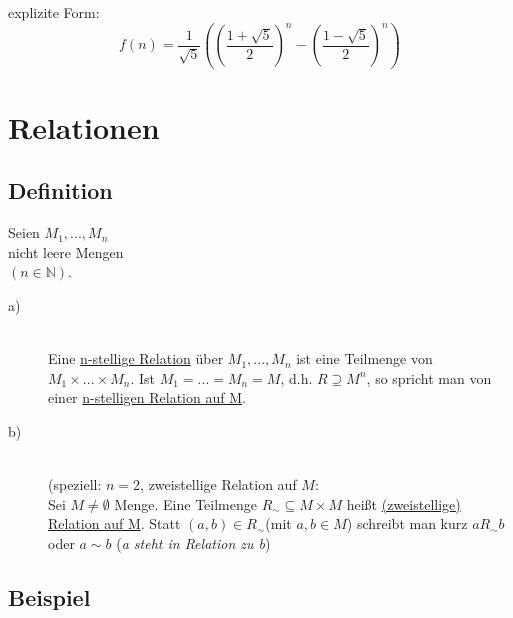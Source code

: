 \documentclass[a4paper, 12pt, twoside] {article}
\begin{document}
explizite Form:
$$f(n) = \frac{1}{\sqrt{5}} (( \frac{1 + \sqrt{5}}{2})^n - (\frac{1- \sqrt{5}}{2})^n)$$

\section{Relationen} %

\subsection{Definition} %
Seien $M_1, ..., M_n$ \\
nicht leere Mengen \\
$(n \in \mathbb{N})$.

\begin{description}

\item[a)] \hfill \\
Eine \underline{n-stellige Relation} über $M_1, ..., M_n$ ist eine Teilmenge von $M_1 \times ... \times M_n$.
Ist $M_1 = ... = M_n = M$, d.h. $R \supseteq M^n$,
so spricht man von einer \underline{n-stelligen Relation auf M}.

\item[b)]  \hfill \\
(speziell: $n = 2$, zweistellige Relation auf $M$: \\
Sei $M \neq \emptyset$ Menge. Eine Teilmenge $R_{\sim} \subseteq M \times M$ heißt \underline{(zweistellige) Relation auf M}. Statt $(a, b) \in R_{\sim} $(mit $a, b \in M$) schreibt man kurz $a R_{\sim} b$ oder $a \sim b$ (\textit{a steht in Relation zu b})

\end{description}

\subsection{Beispiel} %
\end{document}
